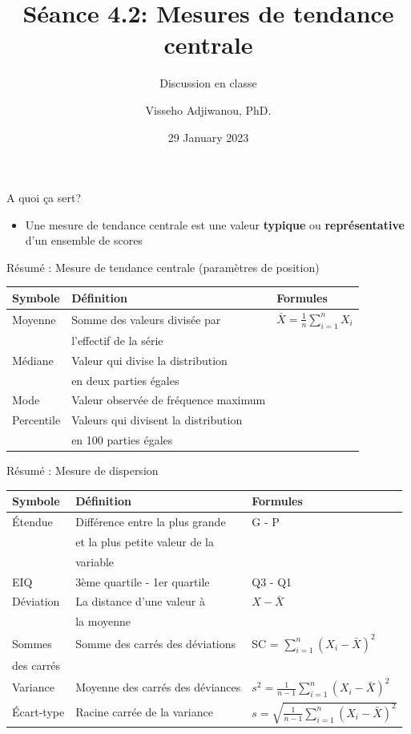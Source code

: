 \documentclass[
  ignorenonframetext,
]{beamer}
\title{Séance 4.2: Mesures de tendance centrale}
\subtitle{Discussion en classe}
\author{Visseho Adjiwanou, PhD.}
\date{29 January 2023}
\providecommand{\tightlist}{%
  \setlength{\itemsep}{0pt}\setlength{\parskip}{0pt}}
\begin{document}
\frame{\titlepage}

\begin{frame}{A quoi ça sert?}
\protect\hypertarget{a-quoi-uxe7a-sert}{}
\begin{itemize}
\tightlist
\item
  Une mesure de tendance centrale est une valeur \textbf{typique} ou
  \textbf{représentative} d'un ensemble de scores
\end{itemize}
\end{frame}

\begin{frame}{Résumé : Mesure de tendance centrale (paramètres de
position)}
\protect\hypertarget{ruxe9sumuxe9-mesure-de-tendance-centrale-paramuxe8tres-de-position}{}
\begin{longtable}[]{@{}lll@{}}
\toprule()
Symbole & Définition & Formules \\
\midrule()
\endhead
Moyenne & Somme des valeurs divisée par &
\(\bar{X} = \frac{1}{n} \sum_{i=1}^n X_i\) \\
& l'effectif de la série & \\
Médiane & Valeur qui divise la distribution & \\
& en deux parties égales & \\
Mode & Valeur observée de fréquence maximum & \\
Percentile & Valeurs qui divisent la distribution & \\
& en 100 parties égales & \\
\bottomrule()
\end{longtable}
\end{frame}

\begin{frame}{Résumé : Mesure de dispersion}
\protect\hypertarget{ruxe9sumuxe9-mesure-de-dispersion}{}
\begin{longtable}[]{@{}lll@{}}
\toprule()
Symbole & Définition & Formules \\
\midrule()
\endhead
Étendue & Différence entre la plus grande & G - P \\
& et la plus petite valeur de la & \\
& variable & \\
EIQ & 3ème quartile - 1er quartile & Q3 - Q1 \\
Déviation & La distance d'une valeur à & \(X - \bar{X}\) \\
& la moyenne & \\
Sommes & Somme des carrés des déviations & SC =
\(\sum_{i=1}^n(X_i-\bar{X})^2\) \\
des carrés & & \\
Variance & Moyenne des carrés des déviances &
\(s^2=\frac{1}{n-1}\sum_{i=1}^n(X_i-\bar{X})^2\) \\
Écart-type & Racine carrée de la variance &
\(s = \sqrt{\frac{1}{n-1} \sum_{i=1}^n(X_i-\bar{X})^2}\) \\
\bottomrule()
\end{longtable}
\end{frame}
\end{document}
